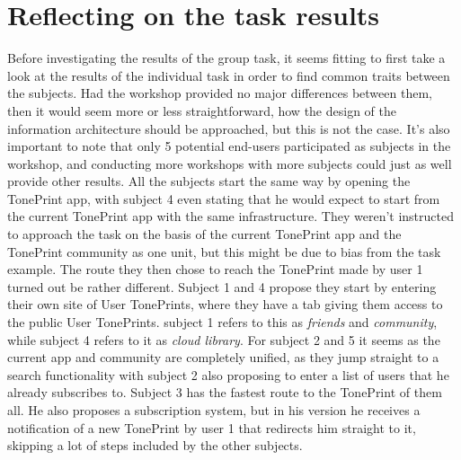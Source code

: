 \section{Reflecting on the task results}
\label{IndividualTaskReflection}
Before investigating the results of the group task, it seems fitting to first take a look at the results of the individual task in order to find common traits between the subjects. Had the workshop provided no major differences between them, then it would seem more or less straightforward, how the design of the information architecture should be approached, but this is not the case. It's also important to note that only 5 potential end-users participated as subjects in the workshop, and conducting more workshops with more subjects could just as well provide other results. All the subjects start the same way by opening the TonePrint app, with subject 4 even stating that he would expect to start from the current TonePrint app with the same infrastructure. They weren't instructed to approach the task on the basis of the current TonePrint app and the TonePrint community as one unit, but this might be due to bias from the task example. The route they then chose to reach the TonePrint made by user 1 turned out be rather different. Subject 1 and 4 propose they start by entering their own site of User TonePrints, where they have a tab giving them access to the public User TonePrints. subject 1 refers to this as \textit{friends} and \textit{community}, while subject 4 refers to it as \textit{cloud library}. For subject 2 and 5 it seems as the current app and community are completely unified, as they jump straight to a search functionality with subject 2 also proposing to enter a list of users that he already subscribes to. Subject 3 has the fastest route to the TonePrint of them all. He also proposes a subscription system, but in his version he receives a notification of a new TonePrint by user 1 that redirects him straight to it, skipping a lot of steps included by the other subjects.

